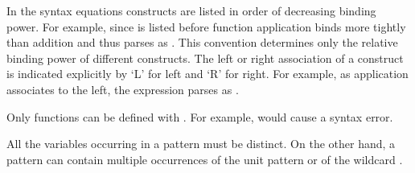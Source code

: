 \documentclass[11pt]{article}
\begin{document}
In the syntax equations constructs are listed in order of decreasing binding
power.  For example, since
 is listed before  function
application binds
more tightly than addition and thus  parses as
.  This convention determines only the relative binding
power of different constructs.  The left or right
association of a construct is indicated explicitly by `L' for left and
`R' for right.  For example, as application associates to the left, the
expression  parses as .
\smallskip

Only functions can be defined with . For example,  would cause a syntax error.
\smallskip

All the variables occurring in a pattern must be distinct.  On the other hand, a
pattern can contain multiple occurrences of the unit pattern \ttQ{()}
or of the wildcard \ttQ{\_}.
\smallskip
\end{document}
